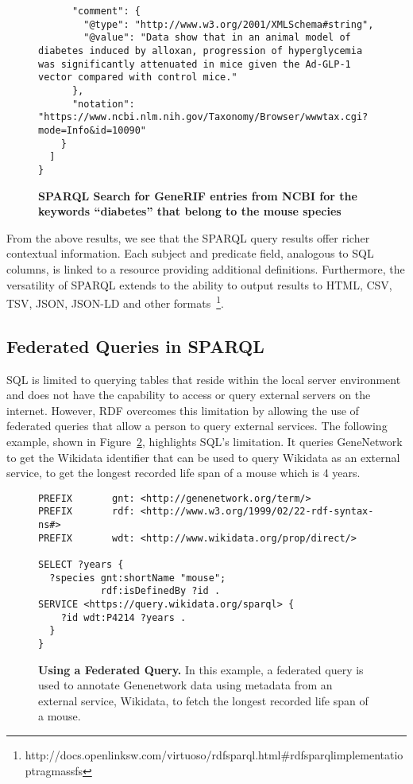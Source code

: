 \begin{figure}[H]
\centering
\begin{verbatim}
      "comment": {
        "@type": "http://www.w3.org/2001/XMLSchema#string",
        "@value": "Data show that in an animal model of diabetes induced by alloxan, progression of hyperglycemia was significantly attenuated in mice given the Ad-GLP-1 vector compared with control mice."
      },
      "notation": "https://www.ncbi.nlm.nih.gov/Taxonomy/Browser/wwwtax.cgi?mode=Info&id=10090"
    }
  ]
}
\end{verbatim}
\caption[SPARQL Results: Search for GeneRIF entries from NCBI for the keyword ``diabetes'' that belongs to the mouse species]{\textbf{SPARQL Search for GeneRIF entries from NCBI for the keywords ``diabetes'' that belong to the mouse species}}\label{sparql:ncbi-rif-results}
\end{figure}

From the above results, we see that the SPARQL query results offer richer contextual information.  Each subject and predicate field, analogous to SQL columns, is linked to a resource providing additional definitions.  Furthermore, the versatility of SPARQL extends to the ability to output results to HTML, CSV, TSV, JSON, JSON-LD and other formats~\footnote{http://docs.openlinksw.com/virtuoso/rdfsparql.html\#rdfsparqlimplementatioptragmassfs}.

\subsection{Federated Queries in SPARQL}

SQL is limited to querying tables that reside within the local server environment and does not have the capability to access or query external servers on the internet.  However, RDF overcomes this limitation by allowing the use of federated queries that allow a person to query external services.  The following example, shown in Figure~\ref{sparql:federated}, highlights SQL's limitation.  It queries GeneNetwork to get the Wikidata identifier that can be used to query Wikidata as an external service, to get the longest recorded life span of a mouse which is 4 years.

\begin{figure}[H]
\centering
\begin{verbatim}
PREFIX       gnt: <http://genenetwork.org/term/>
PREFIX       rdf: <http://www.w3.org/1999/02/22-rdf-syntax-ns#>
PREFIX       wdt: <http://www.wikidata.org/prop/direct/>

SELECT ?years {
  ?species gnt:shortName "mouse";
           rdf:isDefinedBy ?id .
SERVICE <https://query.wikidata.org/sparql> {
    ?id wdt:P4214 ?years .
  }
}
\end{verbatim}
\caption[Federated Query to get longest recorded life span of a mouse from Wikidata]{\textbf{Using a Federated Query.}  In this example, a federated query is used to annotate Genenetwork data using metadata from an external service, Wikidata, to fetch the longest recorded life span of a mouse.}\label{sparql:federated}
\end{figure}

